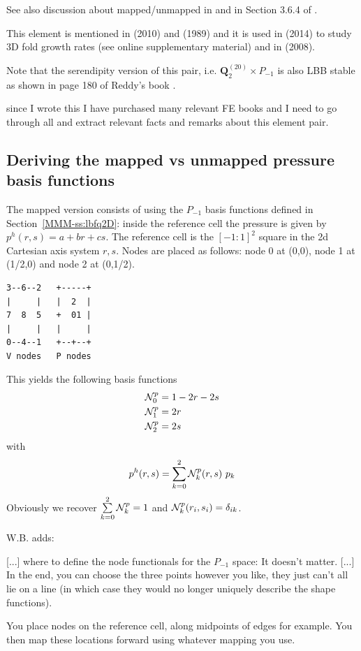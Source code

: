 See also discussion about mapped/unmapped in \textcite{bobf13} and 
in Section 3.6.4 of \textcite{john16}.

This element is mentioned in \textcite{kaus10} (2010) and \textcite{pefc89} (1989) 
and it is used in \textcite{freh14} (2014) to study 3D fold growth rates 
(see online supplementary material) and in \textcite{schm08} (2008).

Note that the serendipity version of this pair, 
i.e. ${\bm Q}_2^{(20)}\times P_{-1}$ is also LBB stable
as shown in page 180 of Reddy's book \cite{reddybook2}.

{\color{red} since I wrote this I have purchased many relevant FE books
and I need to go through all and extract relevant facts and remarks about 
this element pair.}


\subsection*{Deriving the mapped vs unmapped pressure basis functions}


The mapped version consists of  
using the $P_{-1}$ basis functions defined in Section~\ref{MMM-ss:lbfq2D}:
inside the reference cell the pressure is given by $p^h(r,s)=a+br+cs$.
The reference cell is the $[-1:1]^2$ square in the 2d Cartesian axis
system $r,s$.
Nodes are placed as follows: node 0 at (0,0), node 1 at (1/2,0) and node 2 at (0,1/2).

\begin{verbatim}
3--6--2   +-----+
|     |   |  2  |
7  8  5   +  01 |
|     |   |     |
0--4--1   +--+--+
V nodes   P nodes
\end{verbatim}

This yields the following basis functions
\begin{align}
{\mathcal{N}}_0^p &= 1-2r-2s \nonumber\\
{\mathcal{N}}_1^p &= 2r \nonumber\\
{\mathcal{N}}_2^p &= 2s \nonumber
\end{align}
with 
\[
p^h(r,s) = \sum_{k=0}^2 {\mathcal{N}}_k^p(r,s) \ p_k
\]
Obviously we recover $\sum\limits_{k=0}^2 {\mathcal{N}}_k^p = 1$ and ${\mathcal{N}}_k^p(r_i,s_i)=\delta_{ik}$.

W.B. adds:
\begin{displayquote}
{\color{darkgray}
[...] where to define the node functionals for the $P_{-1}$ space: It doesn't
matter. [...] In the end, you can
choose the three points however you like, they just can't all lie on a line
(in which case they would no longer uniquely describe the shape functions).

You place nodes on the reference cell, along midpoints of edges for
example. You then map these locations forward using whatever mapping you use. 
}
\end{displayquote}

